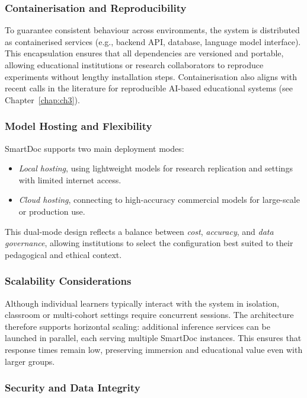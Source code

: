 \subsubsection{Containerisation and Reproducibility}

To guarantee consistent behaviour across environments, the system is distributed as
containerised services (e.g., backend API, database, language model interface).
This encapsulation ensures that all dependencies are versioned and portable, allowing
educational institutions or research collaborators to reproduce experiments without
lengthy installation steps. Containerisation also aligns with recent calls in the
literature for reproducible AI-based educational systems (see Chapter~\ref{chap:ch3}).

\subsubsection{Model Hosting and Flexibility}

SmartDoc supports two main deployment modes:
\begin{itemize}
    \item \emph{Local hosting}, using lightweight models for research replication
    and settings with limited internet access.
    \item \emph{Cloud hosting}, connecting to high-accuracy commercial models for
    large-scale or production use.
\end{itemize}

This dual-mode design reflects a balance between \emph{cost}, \emph{accuracy}, and
\emph{data governance}, allowing institutions to select the configuration best suited
to their pedagogical and ethical context.

\subsubsection{Scalability Considerations}

Although individual learners typically interact with the system in isolation,
classroom or multi-cohort settings require concurrent sessions. The architecture
therefore supports horizontal scaling: additional inference services can be launched
in parallel, each serving multiple SmartDoc instances. This ensures that response
times remain low, preserving immersion and educational value even with larger groups.

\subsubsection{Security and Data Integrity}

